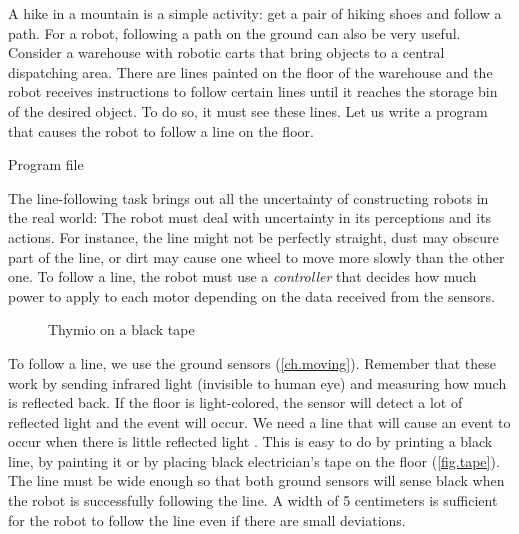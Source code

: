 
\label{ch.line}

A hike in a mountain is a simple activity:
get a pair of hiking shoes and follow a path.
For a robot, following a path on the ground can also be very useful.
Consider a warehouse with robotic carts that bring objects to a central dispatching area.
There are lines painted on the floor of the warehouse and the robot receives instructions to follow
certain lines until it reaches the storage bin of the desired object.
To do so, it must see these lines.
Let us write a program that causes the robot to follow a line on the floor.

{\raggedleft \hfill Program file }

The line-following task brings out all the uncertainty of constructing
robots in the real world: The robot must deal with uncertainty in its perceptions
and its actions.
For instance, the line might not be perfectly straight, dust may obscure part of the line, or dirt may cause one wheel to move more slowly than the other one.
To follow a line, the robot must use a
\emph{controller} that decides how much power to apply to each motor
depending on the data received from the sensors.


\begin{figure}
	\hfill
	\caption{Thymio on a black tape}
\end{figure}

To follow a line, we use the ground sensors (\cref{ch.moving}).
Remember that these work by sending infrared light (invisible to human eye) and measuring how much is reflected back.
If the floor is light-colored, the sensor will detect a lot of reflected
light and the event  will occur. We need a line
that will cause an event to occur when there is little reflected light
. This is easy to do by printing a black line, by painting it or by placing black
electrician's tape on the floor (\cref{fig.tape}). The line must
be wide enough so that both ground sensors will sense black when the
robot is successfully following the line. A width of 5
centimeters is sufficient for the robot to follow the line even if there
are small deviations.

